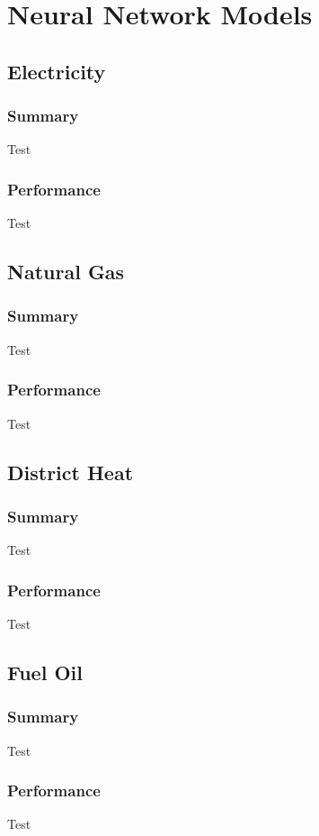 \section*{Neural Network Models}
\label{sec:nn_models}

\subsection{Electricity}

\subsubsection{Summary}
Test

\subsubsection{Performance}
Test

\subsection{Natural Gas}

\subsubsection{Summary}
Test

\subsubsection{Performance}
Test

\subsection{District Heat}

\subsubsection{Summary}
Test

\subsubsection{Performance}
Test

\subsection{Fuel Oil}

\subsubsection{Summary}
Test

\subsubsection{Performance}
Test